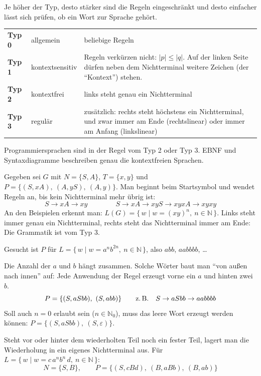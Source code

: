 \begin{merke}
Je höher der Typ, desto stärker sind die Regeln eingeschränkt und desto einfacher lässt sich prüfen, ob ein Wort zur Sprache gehört.

\smallskip
\begin{tabular}{@{}lL{3.3cm}L{9.2cm}@{}}
\textbf{Typ 0} & allgemein & beliebige Regeln \\
\textbf{Typ 1} & kontextsensitiv & Regeln verkürzen nicht: $|p| \leq |q|$. Auf der linken Seite dürfen neben dem Nichtterminal weitere Zeichen (der \enquote{Kontext}) stehen. \\
\textbf{Typ 2} & kontextfrei & links steht genau ein Nichtterminal \\
\textbf{Typ 3} & regulär & zusätzlich: rechts steht höchstens ein Nichtterminal, und zwar immer am Ende (rechtslinear) oder immer am Anfang (linkslinear)
\end{tabular}

\smallskip
Programmiersprachen sind in der Regel vom Typ 2 oder Typ 3. EBNF und Syntaxdiagramme beschreiben genau die kontextfreien Sprachen.
\end{merke}

\beispiele
{}
Gegeben sei $G$ mit $N = \{S, A\}$, $T = \{x, y\}$ und $P = \{(S, xA),\ (A, yS),\ (A, y)\}$. Man beginnt beim Startsymbol und wendet Regeln an, bis kein Nichtterminal mehr übrig ist:
\[
S \to xA \to xy
\qquad\qquad
S \to xA \to xyS \to xyxA \to xyxy
\]
An den Beispielen erkennt man: $L(G) = \{\, w \mid w = (xy)^n,\ n \in \mathbb{N} \,\}$. Links steht immer genau ein Nichtterminal, rechts steht das Nichtterminal immer am Ende: Die Grammatik ist vom Typ 3.

Gesucht ist $P$ für $L = \{\, w \mid w = a^n b^{2n},\ n \in \mathbb{N} \,\}$, also $abb$, $aabbbb$, \ldots

Die Anzahl der $a$ und $b$ hängt zusammen. Solche Wörter baut man \enquote{von außen nach innen} auf: Jede Anwendung der Regel erzeugt vorne ein $a$ und hinten zwei $b$.
\[
P = \{(S, aSbb),\ (S, abb)\}
\qquad\text{z.\,B.}\quad S \to aSbb \to aabbbb
\]
Soll auch $n = 0$ erlaubt sein ($n \in \mathbb{N}_0$), muss das leere Wort erzeugt werden können: $P = \{(S, aSbb),\ (S, \varepsilon)\}$.

Steht vor oder hinter dem wiederholten Teil noch ein fester Teil, lagert man die Wiederholung in ein eigenes Nichtterminal aus. Für $L = \{\, w \mid w = c\,a^n b^n\,d,\ n \in \mathbb{N} \,\}$:
\[
N = \{S, B\}, \qquad P = \{(S, cBd),\ (B, aBb),\ (B, ab)\}
\]

